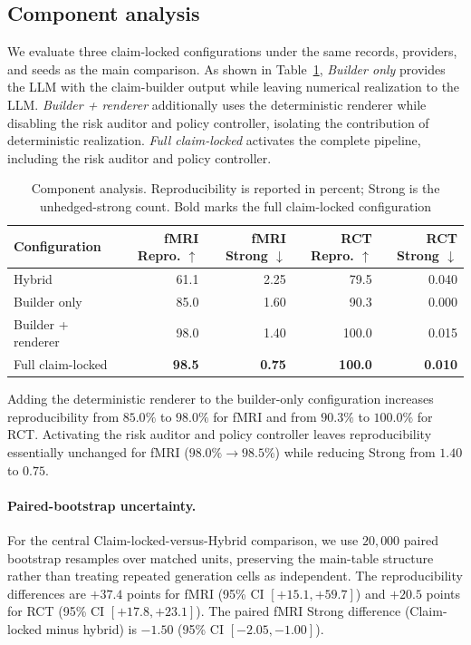 \documentclass[10pt,twocolumn]{article}
\begin{document}
\subsection{Component analysis}
\label{app:component-analysis}

We evaluate three claim-locked configurations under the same records, providers, and seeds as the main comparison. As shown in Table~\ref{tab:component-analysis}, \textit{Builder only} provides the LLM with the claim-builder output while leaving numerical realization to the LLM. \textit{Builder + renderer} additionally uses the deterministic renderer while disabling the risk auditor and policy controller, isolating the contribution of deterministic realization. \textit{Full claim-locked} activates the complete pipeline, including the risk auditor and policy controller.

\begin{table}[t]
\caption{Component analysis. Reproducibility is reported in percent; Strong is the unhedged-strong count. Bold marks the full claim-locked configuration}
\label{tab:component-analysis}
\centering
\footnotesize
\setlength{\tabcolsep}{3pt}
\begin{tabular}{lrrrr}
\toprule
Configuration & fMRI Repro. $\uparrow$ & fMRI Strong $\downarrow$ & RCT Repro. $\uparrow$ & RCT Strong $\downarrow$ \\
\midrule
Hybrid & 61.1 & 2.25 & 79.5 & 0.040 \\
Builder only & 85.0 & 1.60 & 90.3 & 0.000 \\
Builder + renderer & 98.0 & 1.40 & 100.0 & 0.015 \\
Full claim-locked & \textbf{98.5} & \textbf{0.75} & \textbf{100.0} & \textbf{0.010} \\
\bottomrule
\end{tabular}
\end{table}

Adding the deterministic renderer to the builder-only configuration increases reproducibility from $85.0\%$ to $98.0\%$ for fMRI and from $90.3\%$ to $100.0\%$ for RCT. Activating the risk auditor and policy controller leaves reproducibility essentially unchanged for fMRI ($98.0\%\rightarrow98.5\%$) while reducing Strong from $1.40$ to $0.75$.

\paragraph{Paired-bootstrap uncertainty.} For the central Claim-locked-versus-Hybrid comparison, we use $20{,}000$ paired bootstrap resamples over matched units, preserving the main-table structure rather than treating repeated generation cells as independent. The reproducibility differences are $+37.4$ points for fMRI (95\% CI $[+15.1,+59.7]$) and $+20.5$ points for RCT (95\% CI $[+17.8,+23.1]$). The paired fMRI Strong difference (Claim-locked minus hybrid) is $-1.50$ (95\% CI $[-2.05,-1.00]$).
\end{document}
